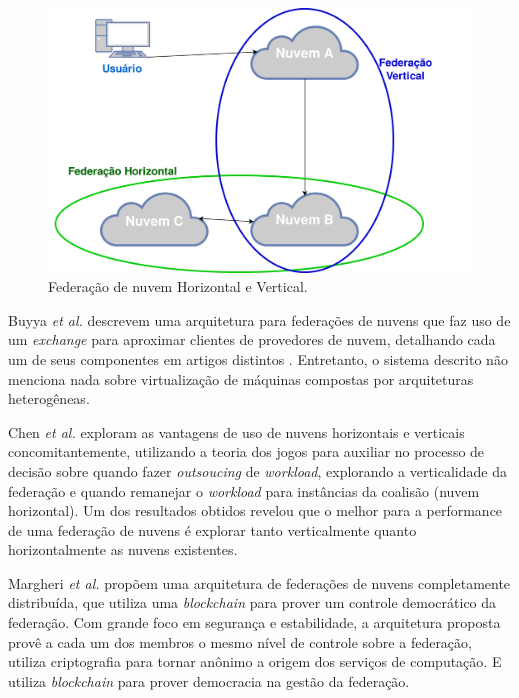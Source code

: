 \begin{figure}[htbp]
	\centerline{\includegraphics[scale=0.032]{img/ExemploFederacao.png}}
	\caption{Federação de nuvem Horizontal e Vertical.}
	\label{ExemploFederacao}
\end{figure}


Buyya \textit{et al.} \cite{Buyya:2010:IUF:2143583.2143586} descrevem uma arquitetura para federações de nuvens que faz uso de um \textit{exchange} para aproximar clientes de provedores de nuvem, detalhando cada um de seus componentes em artigos distintos \cite{Calheiros:2012:CSE:2263483.2264538} \cite{Garg2013} \cite{4539666} \cite{6063003}. Entretanto, o sistema descrito não menciona nada sobre virtualização de máquinas compostas por arquiteturas heterogêneas.

Chen \textit{et al.} \cite{7835207} exploram as vantagens de uso de nuvens horizontais e verticais concomitantemente, utilizando a teoria dos jogos para auxiliar no processo de decisão sobre quando fazer \textit{outsoucing} de \textit{workload}, explorando a verticalidade da federação e quando remanejar o \textit{workload} para instâncias da coalisão (nuvem horizontal). Um dos resultados obtidos revelou que o melhor para a performance de uma federação de nuvens é explorar tanto verticalmente quanto horizontalmente as nuvens existentes.

Margheri \textit{et al.} \cite{FaaS_8030651} propõem uma arquitetura de federações de nuvens completamente distribuída, que utiliza uma \textit{blockchain} para prover um controle democrático da federação. Com grande foco em segurança e estabilidade, a arquitetura proposta provê a cada um dos membros o mesmo nível de controle sobre a federação, utiliza criptografia para tornar anônimo a origem dos serviços de computação. E utiliza \textit{blockchain} para prover democracia na gestão da federação.


